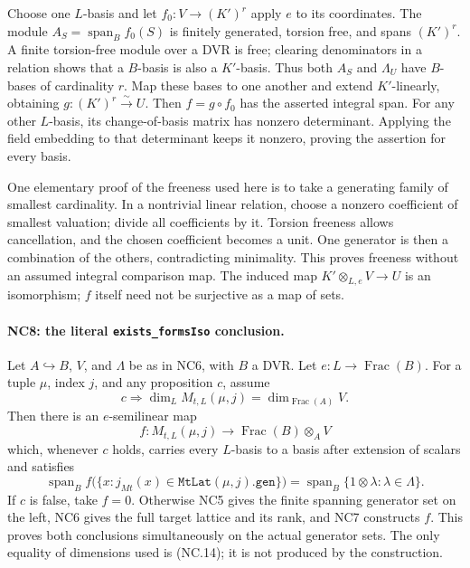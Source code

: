 Choose one \(L\)-basis and let \(f_0:V\to(K')^r\) apply \(e\)
to its coordinates. The module
\(A_S=\operatorname{span}_B f_0(S)\) is finitely generated,
torsion free, and spans \((K')^r\). A finite torsion-free
module over a DVR is free; clearing denominators in a relation
shows that a \(B\)-basis is also a \(K'\)-basis. Thus both
\(A_S\) and \(\Lambda_U\) have \(B\)-bases of cardinality \(r\).
Map these bases to one another and extend \(K'\)-linearly,
obtaining \(g:(K')^r\overset{\sim}{\longrightarrow}U\).
Then \(f=g\circ f_0\) has the asserted integral span.
For any other \(L\)-basis, its change-of-basis matrix has
nonzero determinant. Applying the field embedding to that
determinant keeps it nonzero, proving the assertion for
every basis.

One elementary proof of the freeness used here is to take
a generating family of smallest cardinality. In a nontrivial
linear relation, choose a nonzero coefficient of smallest
valuation; divide all coefficients by it. Torsion freeness
allows cancellation, and the chosen coefficient becomes a
unit. One generator is then a combination of the others,
contradicting minimality. This proves freeness without an
assumed integral comparison map.
The induced map \(K'\otimes_{L,e}V\to U\) is an isomorphism;
\(f\) itself need not be surjective as a map of sets.

\paragraph{NC8: the literal \texttt{exists\_formsIso} conclusion.}
Let \(A\hookrightarrow B\), \(V\), and \(\Lambda\) be as in
NC6, with \(B\) a DVR. Let \(e:L\to\operatorname{Frac}(B)\).
For a tuple \(\mu\), index \(j\), and any proposition \(c\),
assume
\[
 c\Longrightarrow
 \dim_L M_{t,L}(\mu,j)=\dim_{\operatorname{Frac}(A)}V.
 \tag{NC.14}
\]
Then there is an \(e\)-semilinear map
\[
 f:M_{t,L}(\mu,j)\longrightarrow
       \operatorname{Frac}(B)\otimes_A V
 \tag{NC.15}
\]
which, whenever \(c\) holds, carries every \(L\)-basis to a
basis after extension of scalars and satisfies
\[
 \operatorname{span}_B
 f\bigl(\{x:j_{Mt}(x)\in\texttt{MtLat}(\mu,j).\texttt{gen}\}\bigr)
 =
 \operatorname{span}_B\{1\otimes\lambda:\lambda\in\Lambda\}.
 \tag{NC.16}
\]
If \(c\) is false, take \(f=0\). Otherwise NC5 gives the
finite spanning generator set on the left, NC6 gives the
full target lattice and its rank, and NC7 constructs \(f\).
This proves both conclusions simultaneously on the actual
generator sets. The only equality of dimensions used is
(NC.14); it is not produced by the construction.


